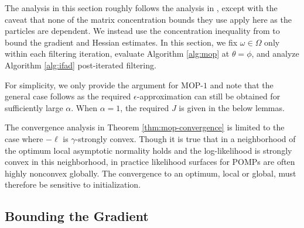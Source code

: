 


The analysis in this section roughly follows the analysis in \cite{mahoney16}, except with the caveat that none of the matrix concentration bounds they use apply here as the particles are dependent. We instead use the concentration inequality from \cite{delMoral11} to bound the gradient and Hessian estimates. In this section, we fix $\omega \in \Omega$ only within each filtering iteration, evaluate Algorithm \ref{alg:mop} at $\theta=\phi$, and analyze Algorithm \ref{alg:ifad} post-iterated filtering.

For simplicity, we only provide the argument for MOP-$1$ and note that the general case follows as the required $\epsilon$-approximation can still be obtained for sufficiently large $\alpha$. 
When $\alpha=1$, the required $J$ is given in the below lemmas. 

The convergence analysis in Theorem \ref{thm:mop-convergence} is limited to the case where $-\ell$ is $\gamma$-strongly convex. Though it is true that in a neighborhood of the optimum local asymptotic normality holds and the log-likelihood is strongly convex in this neighborhood, in practice likelihood surfaces for POMPs are often highly nonconvex globally. The convergence to an optimum, local or global, must therefore be sensitive to initialization.  

\subsection{Bounding the Gradient}


